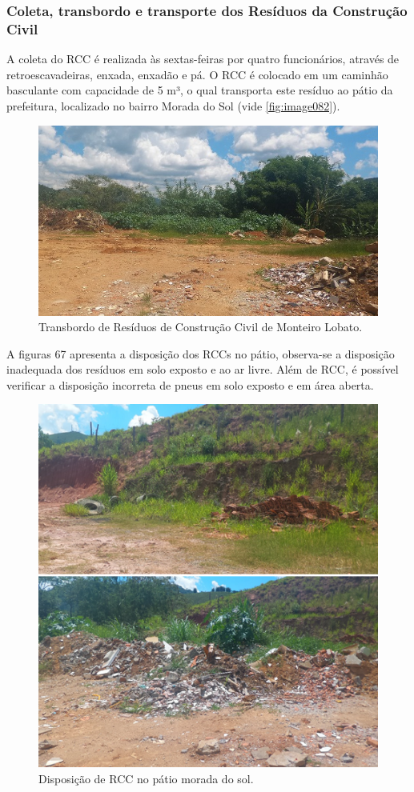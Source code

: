 	
	\subsubsection{Coleta, transbordo e transporte dos Resíduos da Construção Civil}
	A coleta do RCC é realizada às sextas-feiras por quatro funcionários, através de retroescavadeiras, enxada, enxadão e pá. O RCC é colocado em um caminhão basculante com capacidade de 5 m³, o qual transporta este resíduo ao pátio da prefeitura, localizado no bairro Morada do Sol (vide \autoref{fig:image082}).
	
	\begin{figure}
		\centering
		\includegraphics[width=0.75\linewidth]{produtos/prodtres/image082}
		\caption{Transbordo de Resíduos de Construção Civil de Monteiro Lobato.}
		\label{fig:image082}
	\end{figure}
	
	
	A figuras 67 apresenta a disposição dos RCCs no pátio, observa-se a disposição inadequada dos resíduos em solo exposto e ao ar livre. Além de RCC, é possível verificar a disposição incorreta de pneus em solo exposto e em área aberta.
	
	\begin{figure}
		\centering
		\includegraphics[width=0.75\linewidth]{produtos/prodtres/image083}
		\caption{Disposição de RCC no pátio morada do sol.}
		\label{fig:image083}
	\end{figure}
	
